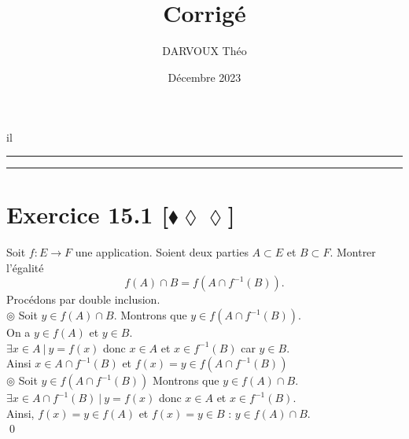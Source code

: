 il\documentclass[10pt]{article}
\title{\bf{\pagetitle}\\\large{Corrigé}}
\date{Décembre 2023}
\author{DARVOUX Théo}
\def\pagetitle{Applications}
\begin{document}
\renewcommand*\contentsname{Exercices.}
\renewcommand*{\cftsecleader}{\cftdotfill{\cftdotsep}}
\maketitle

\hrule
\tableofcontents
\vspace{0.5cm}
\hrule

\thispagestyle{fancy}
\fancyhead[C]{\pagetitle}
\allowdisplaybreaks

\pagebreak


\section*{Exercice 15.1 [$\blacklozenge\lozenge\lozenge$]}
\begin{tcolorbox}[enhanced, width=7.6in, center, size=fbox, fontupper=\large, drop shadow southwest]
    Soit $f:E\to F$ une application. Soient deux parties $A \subset E$ et $B \subset F$. Montrer l'égalité
    \begin{equation*}
        f(A) \cap B = f(A \cap f^{-1}(B)).
    \end{equation*}
    Procédons par double inclusion.\\
    $\circledcirc$ Soit $y\in f(A) \cap B$. Montrons que $y\in f(A \cap f^{-1}(B))$.\\
    On a $y\in f(A)$ et $y\in B$.\\
    $\exists x\in A ~ | ~ y = f(x)$ donc $x\in A$ et $x\in f^{-1}(B)$ car $y\in B$.\\
    Ainsi $x\in A\cap f^{-1}(B)$ et $f(x) = y \in f(A \cap f^{-1}(B))$\\[0.15cm]
    $\circledcirc$ Soit $y\in f(A \cap f^{-1}(B))$ Montrons que $y\in f(A) \cap B$.\\
    $\exists x \in A \cap f^{-1}(B) ~ | ~ y = f(x)$ donc $x\in A$ et $x \in f^{-1}(B)$.\\
    Ainsi, $f(x) = y \in f(A)$ et $f(x) = y \in B$ : $y\in f(A)\cap B$.\\
    \qed
\end{tcolorbox}
\end{document}

